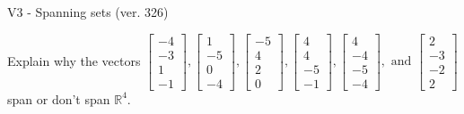 \begin{exercise}
  \begin{exerciseTitle}V3 - Spanning sets (ver. 326)\end{exerciseTitle}
  \begin{exerciseStatement}
    Explain why the vectors \(\left[\begin{array}{r}
-4 \\
-3 \\
1 \\
-1
\end{array}\right] , \left[\begin{array}{r}
1 \\
-5 \\
0 \\
-4
\end{array}\right] , \left[\begin{array}{r}
-5 \\
4 \\
2 \\
0
\end{array}\right] , \left[\begin{array}{r}
4 \\
4 \\
-5 \\
-1
\end{array}\right] , \left[\begin{array}{r}
4 \\
-4 \\
-5 \\
-4
\end{array}\right] , \text{ and } \left[\begin{array}{r}
2 \\
-3 \\
-2 \\
2
\end{array}\right]\) span or don't span \(\mathbb{R}^4\). 
	



\end{exerciseStatement}
\end{exercise}
